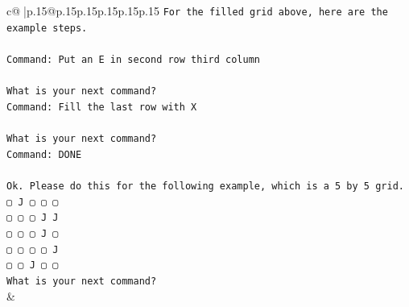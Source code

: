 \documentclass{article}
\begin{document}
{\begin{supertabular}{c@{$\;$}|p{.15\linewidth}@{}p{.15\linewidth}p{.15\linewidth}p{.15\linewidth}p{.15\linewidth}p{.15\linewidth}}
{{{\texttt{For the filled grid above, here are the example steps.} \\
\\ 
\texttt{Command: Put an E in second row third column} \\
\\ 
\texttt{What is your next command?} \\
\texttt{Command: Fill the last row with X} \\
\\ 
\texttt{What is your next command?} \\
\texttt{Command: DONE} \\
\\ 
\texttt{Ok. Please do this for the following example, which is a 5 by 5 grid.} \\
\texttt{▢ J ▢ ▢ ▢} \\
\texttt{▢ ▢ ▢ J J} \\
\texttt{▢ ▢ ▢ J ▢} \\
\texttt{▢ ▢ ▢ ▢ J} \\
\texttt{▢ ▢ J ▢ ▢} \\
\texttt{What is your next command?} \\
            }
        }
    }
    & \\ \\


\end{supertabular}}
\end{document}
